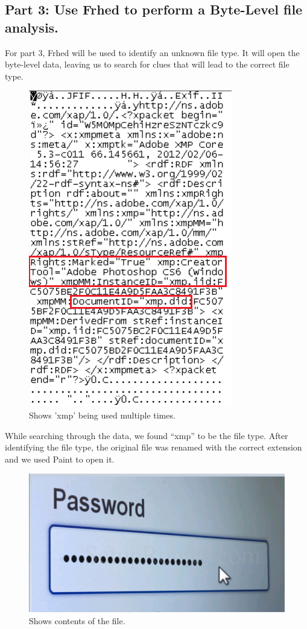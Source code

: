 \subsection{Part 3: Use Frhed to perform a Byte-Level file analysis.}
For part 3, Frhed will be used to identify an unknown file type. It will open the byte-level data, leaving us to search for clues that will lead to the correct file type.

\begin{figure}[H]
    \centering
    \includegraphics[width=0.6\linewidth]{figures/pic20.png}
    \caption{Shows 'xmp' being used multiple times.}
\end{figure}
While searching through the data, we found “xmp” to be the file type.
After identifying the file type, the original file was renamed with the correct extension and we used Paint to open it.
\begin{figure}[H]
    \centering
    \includegraphics[width=0.8\linewidth]{figures/pic21.png}
    \caption{Shows contents of the file.}
\end{figure}

